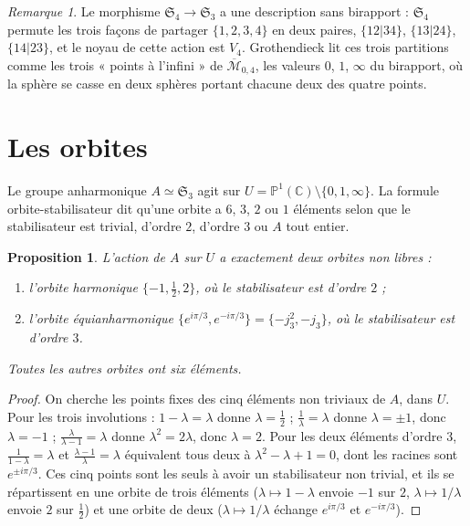 \documentclass[11pt,a4paper]{article}
\theoremstyle{plain}
\newtheorem{proposition}[theoreme]{Proposition}
\theoremstyle{definition}
\theoremstyle{remark}
\newtheorem{remarque}[theoreme]{Remarque}
\newcommand{\C}{\mathbb{C}}
\newcommand{\Pu}{\mathbb{P}^1}
\newcommand{\Sym}{\mathfrak{S}}
\begin{document}
\begin{remarque}
Le morphisme $\Sym_4\to\Sym_3$ a une description sans birapport : $\Sym_4$ permute les trois façons de partager $\{1,2,3,4\}$ en deux paires, $\{12|34\}$, $\{13|24\}$, $\{14|23\}$, et le noyau de cette action est $V_4$. Grothendieck lit ces trois partitions comme les trois « points à l'infini » de $\overline{\mathcal M}_{0,4}$, les valeurs $0$, $1$, $\infty$ du birapport, où la sphère se casse en deux sphères portant chacune deux des quatre points.
\end{remarque}

\section{Les orbites}

Le groupe anharmonique $A\simeq\Sym_3$ agit sur $U=\Pu(\C)\setminus\{0,1,\infty\}$. La formule orbite-stabilisateur dit qu'une orbite a $6$, $3$, $2$ ou $1$ éléments selon que le stabilisateur est trivial, d'ordre $2$, d'ordre $3$ ou $A$ tout entier.

\begin{proposition}\label{prop:orbites}
L'action de $A$ sur $U$ a exactement deux orbites non libres :
\begin{enumerate}[nosep]
\item l'orbite \emph{harmonique} $\{-1,\frac12,2\}$, où le stabilisateur est d'ordre $2$ ;
\item l'orbite \emph{équianharmonique} $\{e^{i\pi/3},e^{-i\pi/3}\}=\{-j_3^2,-j_3\}$, où le stabilisateur est d'ordre $3$.
\end{enumerate}
Toutes les autres orbites ont six éléments.
\end{proposition}

\begin{proof}
On cherche les points fixes des cinq éléments non triviaux de $A$, dans $U$. Pour les trois involutions : $1-\lambda=\lambda$ donne $\lambda=\frac12$ ; $\frac1\lambda=\lambda$ donne $\lambda=\pm1$, donc $\lambda=-1$ ; $\frac\lambda{\lambda-1}=\lambda$ donne $\lambda^2=2\lambda$, donc $\lambda=2$. Pour les deux éléments d'ordre $3$, $\frac1{1-\lambda}=\lambda$ et $\frac{\lambda-1}\lambda=\lambda$ équivalent tous deux à $\lambda^2-\lambda+1=0$, dont les racines sont $e^{\pm i\pi/3}$. Ces cinq points sont les seuls à avoir un stabilisateur non trivial, et ils se répartissent en une orbite de trois éléments ($\lambda\mapsto1-\lambda$ envoie $-1$ sur $2$, $\lambda\mapsto1/\lambda$ envoie $2$ sur $\frac12$) et une orbite de deux ($\lambda\mapsto1/\lambda$ échange $e^{i\pi/3}$ et $e^{-i\pi/3}$).
\end{proof}
\end{document}
